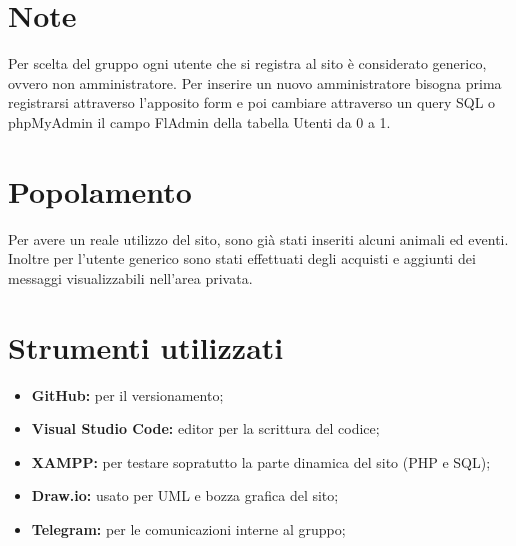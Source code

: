 \appendix
    \section{Note}
    Per scelta del gruppo ogni utente che si registra al sito è considerato generico, ovvero non amministratore. Per inserire un nuovo amministratore bisogna prima registrarsi attraverso l'apposito form e poi cambiare attraverso un query SQL o phpMyAdmin il campo FlAdmin della tabella Utenti da 0 a 1.

    \section{Popolamento}
    Per avere un reale utilizzo del sito, sono già stati inseriti alcuni animali ed eventi. Inoltre per l'utente generico sono stati effettuati degli acquisti e aggiunti dei messaggi visualizzabili nell'area privata.

    \section{Strumenti utilizzati}
    \begin{itemize}
        \item \textbf{GitHub:} per il versionamento; 
        \item \textbf{Visual Studio Code:} editor per la scrittura del codice; 
        \item \textbf{XAMPP:} per testare sopratutto la parte dinamica del sito (PHP e SQL);
        \item \textbf{Draw.io:} usato per UML e bozza grafica del sito;
        \item \textbf{Telegram:} per le comunicazioni interne al gruppo;
    \end{itemize}
\pagebreak